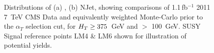\begin{figure}[htpb]
\centering
\begin{minipage}[b]{1.\linewidth}
\centering
{}
\hspace{0.2cm}
\end{minipage}
    \caption{\label{fig:preselplota}Distributions of (a) \HT, (b) NJet, showing comparisons of 1.1\,fb$^{-1}$ 2011 7~TeV CMS Data and equivalently weighted Monte-Carlo prior to the $\alpha_{T}$ selection cut, for $H_{T} \geq 375$~GeV and \MHT $>$ 100~GeV. SUSY Signal reference points LM4 \& LM6 shown for illustration of potential yields.}
\end{figure}

